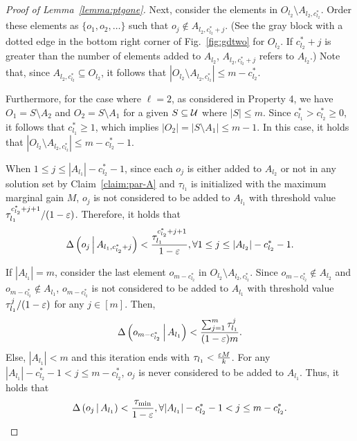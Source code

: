 \begin{proof}[Proof of Lemma~\ref{lemma:ptgone}]
Next, consider the elements in $O_{l_2}\setminus A_{l_2, c_{l_2}^*}$.
Order these elements as $\{o_1, o_2, \ldots\}$ such that $o_j \not \in A_{l_2, c_{l_2}^*+j}$.
(See the gray block with a dotted edge in the bottom right corner of Fig.~\ref{fig:gdtwo} for $O_{l_2}$.
If $c_{l_2}^*+j$ is greater than the number of elements added to $A_{l_2}$,
$A_{l_2, c_{l_2}^*+j}$ refers to $A_{l_2}$.)
Note that, since $A_{l_2, c_{l_2}^*} \subseteq O_{l_2}$,
it follows that $|O_{l_2}\setminus A_{l_2, c_{l_2}^*}| \le m - c_{l_2}^*$.

Furthermore, for the case where $\ell  = 2$, as considered in Property 4,
we have $O_1 = S\setminus A_2$ and $O_2 = S\setminus A_1$ for a given $S\subseteq \mathcal U$
where $|S| \le m$.
Since $c_{l_1}^* > c_{l_2}^* \ge 0$,
it follows that $c_{l_1}^*\ge 1$, which implies $|O_2| = |S\setminus A_1|\le m-1$.
In this case, it holds that $|O_{l_2}\setminus A_{l_2, c_{l_2}^*}| \le m - c_{l_2}^*-1$.

When $1 \le j \le |A_{l_1}|- c_{l_2}^* - 1$, 
since each $o_j$ is either added to $A_{l_2}$ or not in any solution set by Claim~\ref{claim:par-A}
and $\tau_{l_1}$ is initialized with the maximum marginal gain $M$,
$o_j$ is not considered to be added to $A_{l_1}$ with threshold value $\tau_{l_1}^{c_{l_2}^* + j+1}/(1-\varepsilon)$.
Therefore, it holds that 
\begin{equation}\label{inq:ptgone-case2-6}
\Delta \left( o_j \, \middle| \, A_{l_1, c_{l_2}^*+j} \right) < \frac{\tau_{l_1}^{c_{l_2}^* + j+1}}{1-\varepsilon}, \forall 1\le j\le |A_{l_2}|- c_{l_2}^* - 1.
\end{equation}

If $|A_{l_1}| = m$,
consider the last element $o_{m-c_{l_2}^*}$ in $O_{l_2}\setminus A_{l_2, c_{l_2}^*}$.
Since $o_{m-c_{l_2}^*} \not\in A_{l_2}$ and $o_{m-c_{l_2}^*} \not\in A_{l_1}$, $o_{m-c_{l_2}^*}$ is not considered to be added to 
$A_{l_1}$ with threshold value $\tau_{l_1}^j/(1-\varepsilon)$ for any $j \in [m]$.
Then,
\begin{equation}\label{inq:ptgone-case2-7}
\Delta \left( o_{m-c_{l_2}^*} \, \middle| \, A_{l_1} \right) < \frac{\sum_{j=1}^m \tau_{l_1}^j}{(1-\varepsilon)m}.
\end{equation}
Else, $|A_{l_1}| < m$ and 
this iteration ends with $\tau_{l_1} < \frac{\varepsilon M}{k}$.
For any $|A_{l_1}|- c_{l_2}^* - 1 < j\le m- c_{l_2}^*$,
$o_j$ is never considered to be added to $A_{l_1}$.
Thus, it holds that
\begin{equation}\label{inq:ptgone-case2-8}
\Delta \left( o_j \, \middle| \, A_{l_1} \right) < \frac{\tau_{\min}}{1-\varepsilon}, 
\forall |A_{l_1}|- c_{l_2}^* - 1 < j \le m- c_{l_2}^*.
\end{equation}


\end{proof}
